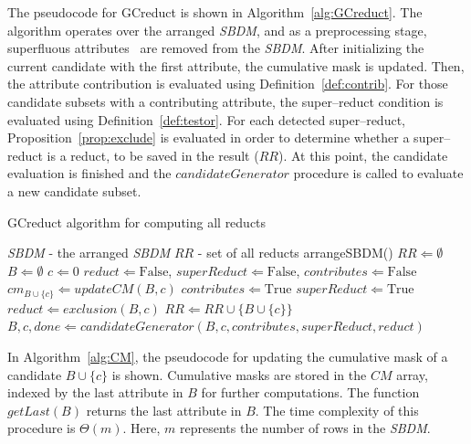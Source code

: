 \documentclass[number,preprint,review,12pt]{elsarticle}
\begin{document}
	\label{superfluous}
	The pseudocode for GCreduct is shown in Algorithm~\ref{alg:GCreduct}. The algorithm operates over the arranged \textit{SBDM}, and as a preprocessing stage, superfluous attributes~\cite{Lazo-Cortes2013} are removed from the \textit{SBDM}. After initializing the current candidate with the first attribute, the cumulative mask is updated. Then, the attribute contribution is evaluated using Definition~\ref{def:contrib}. For those candidate subsets with a contributing attribute, the super--reduct condition is evaluated using Definition~\ref{def:testor}. For each detected super--reduct, Proposition~\ref{prop:exclude} is evaluated in order to determine whether a super--reduct is a reduct, to be saved in the result ($RR$). At this point, the candidate evaluation is finished and the $candidateGenerator$ procedure is called to evaluate a new candidate subset.
	
	\begin{algorithm}
	\footnotesize
	\caption{GCreduct algorithm for computing all reducts}
	\label{alg:GCreduct}
	\begin{algorithmic}[1]
		\Require \textit{SBDM} - the arranged \textit{SBDM}
		\Ensure $RR$ - set of all reducts
		\State arrangeSBDM()
		\State $RR \Leftarrow \emptyset$
		\State $B \Leftarrow \emptyset$  
		\State $c \Leftarrow 0$ 
			\State $reduct \Leftarrow \mathrm{False}$, $superReduct \Leftarrow \mathrm{False}$, $contributes \Leftarrow \mathrm{False}$
		  	\State $cm_{B\cup \lbrace c\rbrace} \Leftarrow updateCM(B,c)$
		  	\label{line:contrib}
		  		\State $contributes \Leftarrow \mathrm{True}$
		  		\label{line:superReduct}
		  			\State $superReduct \Leftarrow \mathrm{True}$
		  			\State $reduct \Leftarrow exclusion(B,c)$
		  				\State $RR \Leftarrow RR \cup \lbrace B\cup \lbrace c\rbrace \rbrace$
		  			\EndIf
		  		\EndIf
		  	\EndIf
			\State $B,c,done \Leftarrow candidateGenerator(B,c,contributes,superReduct,reduct)$
	\EndWhile 
		\end{algorithmic}
	\end{algorithm}
	
	In Algorithm~\ref{alg:CM}, the pseudocode for updating the cumulative mask of a candidate $B\cup\lbrace c\rbrace$ is shown. Cumulative masks are stored in the $CM$ array, indexed by the last attribute in $B$ for further computations. The function $getLast(B)$ returns the last attribute in $B$. The time complexity of this procedure is $\Theta(m)$. Here, $m$ represents the number of rows in the \textit{SBDM}.
	
\end{document}
